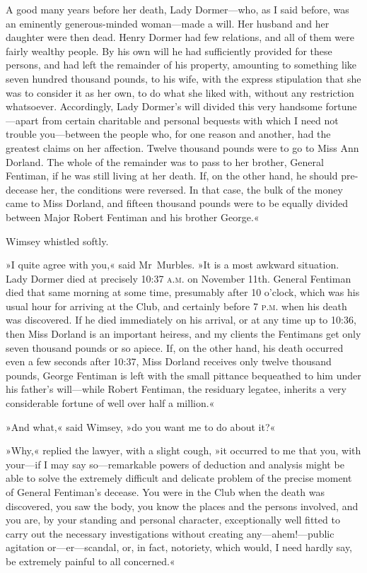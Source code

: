 A good many years before her death, Lady Dormer—who, as I said before, was an eminently generous-minded woman—made a will. Her husband and her daughter were then dead. Henry Dormer had few relations, and all of them were fairly wealthy people. By his own will he had sufficiently provided for these persons, and had left the remainder of his property, amounting to something like seven hundred thousand pounds, to his wife, with the express stipulation that she was to consider it as her own, to do what she liked with, without any restriction whatsoever. Accordingly, Lady Dormer's will divided this very handsome fortune—apart from certain charitable and personal bequests with which I need not trouble you—between the people who, for one reason and another, had the greatest claims on her affection. Twelve thousand pounds were to go to Miss Ann Dorland. The whole of the remainder was to pass to her brother, General Fentiman, if he was still living at her death. If, on the other hand, he should pre-decease her, the conditions were reversed. In that case, the bulk of the money came to Miss Dorland, and fifteen thousand pounds were to be equally divided between Major Robert Fentiman and his brother George.«

Wimsey whistled softly.

»I quite agree with you,« said Mr~Murbles. »It is a most awkward situation. Lady Dormer died at precisely 10:37 \textsc{a.m.} on November  11th. General Fentiman died that same morning at some time, presumably after 10 o'clock, which was his usual hour for arriving at the Club, and certainly before 7 \textsc{p.m.} when his death was discovered. If he died immediately on his arrival, or at any time up to 10:36, then Miss Dorland is an important heiress, and my clients the Fentimans get only seven thousand pounds or so apiece. If, on the other hand, his death occurred even a few seconds after 10:37, Miss Dorland receives only twelve thousand pounds, George Fentiman is left with the small pittance bequeathed to him under his father's will—while Robert Fentiman, the residuary legatee, inherits a very considerable fortune of well over half a million.«

»And what,« said Wimsey, »do you want me to do about it?«

»Why,« replied the lawyer, with a slight cough, »it occurred to me that you, with your—if I may say so—remarkable powers of deduction and analysis might be able to solve the extremely difficult and delicate problem of the precise moment of General Fentiman's decease. You were in the Club when the death was discovered, you saw the body, you know the places and the persons involved, and you are, by your standing and personal character, exceptionally well fitted to carry out the necessary investigations without creating any—ahem!—public agitation or—er—scandal, or, in fact, notoriety, which would, I need hardly say, be extremely painful to all concerned.«

